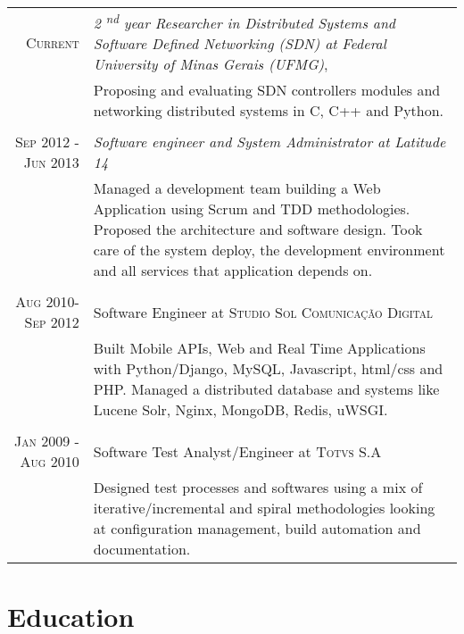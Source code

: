 \documentclass[a4paper,10pt]{article} %
\begin{document}
\begin{tabular}{r|p{11cm}}

\textsc{Current} & \emph{ 2 \textsuperscript{nd} year Researcher in Distributed 
Systems and Software Defined Networking (SDN)
at Federal University of Minas Gerais (UFMG)}, \\ 
& \footnotesize{Proposing and evaluating SDN controllers modules and 
networking distributed systems in C, C++ and Python.} \\
\multicolumn{2}{c}{} \\

\textsc{Sep 2012 - Jun 2013} & \emph{Software engineer and System 
Administrator at Latitude 14} \\ 
& \footnotesize{Managed a development team building a Web Application using 
Scrum and TDD methodologies. 
Proposed the architecture and software design.
Took care of the system deploy, the development environment and all 
services that application depends on.} \\
\multicolumn{2}{c}{} \\


\textsc{Aug 2010-Sep 2012} & Software Engineer at \textsc{Studio Sol
Comunicação Digital}  \\
& \footnotesize{Built Mobile APIs, Web and Real Time Applications 
with Python/Django, MySQL, Javascript, html/css and PHP. 
Managed a distributed database and systems 
like Lucene Solr, Nginx, MongoDB, Redis, uWSGI. }\\
\multicolumn{2}{c}{} \\


\textsc{Jan 2009 - Aug 2010} & Software Test Analyst/Engineer
at \textsc{Totvs S.A} \\
& \footnotesize{Designed test processes and softwares using a mix 
of iterative/incremental and spiral methodologies looking at
configuration management, build automation and documentation.}
\end{tabular}





\section{Education}
\end{document}
